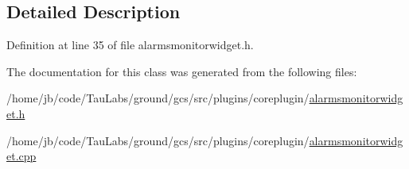 \subsection{\-Detailed \-Description}


\-Definition at line 35 of file alarmsmonitorwidget.\-h.



\-The documentation for this class was generated from the following files\-:\begin{DoxyCompactItemize}
\item 
/home/jb/code/\-Tau\-Labs/ground/gcs/src/plugins/coreplugin/\hyperlink{alarmsmonitorwidget_8h}{alarmsmonitorwidget.\-h}\item 
/home/jb/code/\-Tau\-Labs/ground/gcs/src/plugins/coreplugin/\hyperlink{alarmsmonitorwidget_8cpp}{alarmsmonitorwidget.\-cpp}\end{DoxyCompactItemize}

